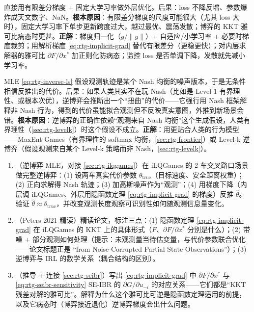 \begin{pitfall}
直接用有限差分梯度 + 固定大学习率做外层优化。后果：loss 不降反增、参数爆炸成天文数字、NaN。\textbf{根本原因}：有限差分梯度的尺度可能很大（尤其 loss 大时），固定大学习率下单步更新跨度过大，越过最优、震荡发散；博弈的 KKT 雅可比病态时更甚。\textbf{正解}：梯度归一化（$g/\lVert g\rVert$）+ 自适应/小学习率 + 必要时梯度裁剪；用解析梯度 \cref{eq:rtg-implicit-grad} 替代有限差分（更稳更快）；对内层求解器的雅可比 $\partial F/\partial x^*$ 加正则化防病态；监控 loss 是否单调下降，发散就先减小学习率。
\end{pitfall}

\begin{pitfall}
MLE \cref{eq:rtg-inverse-ls} 假设观测轨迹是某个 Nash 均衡的噪声版本，于是无条件相信反推出的代价。后果：如果人类其实不在玩 Nash（比如是 Level-1 有界理性、或根本次优），逆博弈会推断出一个“扭曲”的代价——它强行用 Nash 框架解释非 Nash 行为，得到的代价虽能拟合观测但不反映真实意图，外推到新场景会错。\textbf{根本原因}：逆博弈的正确性依赖“观测来自 Nash 均衡”这个生成假设，人类有界理性（\cref{sec:rtg-levelk}）时这个假设不成立。\textbf{正解}：用更贴合人类的行为模型——MaxEnt Games（有界理性的 softmax 均衡，\cref{sec:rtg-frontier}）或 Level-k 逆博弈（假设观测来自某个 Level-k 策略而非 Nash，\cref{sec:rtg-levelk}）。
\end{pitfall}

\begin{practice}
\begin{enumerate}
  \item （逆博弈 MLE，对接 \cref{sec:rtg-ilqgames}）在 iLQGames 的 2 车交叉路口场景做完整逆博弈：(1) 设两车真实代价参数 $\theta_{\text{true}}$（目标速度、安全距离权重）；(2) 正向求解得 Nash 轨迹；(3) 加高斯噪声作为“观测”；(4) 用梯度下降（内层调 iLQGames、外层用隐函数定理 \cref{eq:rtg-implicit-grad} 的梯度）反推 $\hat\theta$。验证 $\hat\theta\approx\theta_{\text{true}}$，并改变观测长度观察可识别性如何随观测信息量变化。
  \item （Peters 2021 精读）精读论文，标注三点：(1) 隐函数定理 \cref{eq:rtg-implicit-grad} 在 iLQGames 的 KKT 上的具体形式（$F$、$\partial F/\partial x^*$ 分别是什么）；(2) 带噪 + 部分观测如何处理（提示：未观测量当待估变量，与代价参数联合优化——论文标题正是 “from Noise-Corrupted Partial State Observations”）；(3) 逆博弈与 IRL 的数学关系（耦合结构的区别）。
  \item （推导 + 连接 \cref{sec:rtg-seibr}）写出 \cref{eq:rtg-implicit-grad} 中 $\partial F/\partial x^*$ 与 \cref{eq:rtg-seibr-sensitivity} SE-IBR 的 $\partial G/\partial u_{-i}$ 的对应关系——它们都是“KKT 残差对解的雅可比”。解释为什么这个雅可比可逆是隐函数定理适用的前提，以及它病态时（博弈接近退化）逆博弈梯度会出什么问题。
\end{enumerate}
\end{practice}

